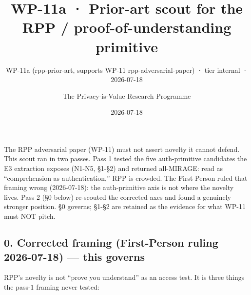 \documentclass[
  11pt,
]{article}
\title{WP-11a · Prior-art scout for the RPP / proof-of-understanding
primitive}
\subtitle{WP-11a (rpp-prior-art, supports WP-11 rpp-adversarial-paper) ·
tier internal · 2026-07-18}
\author{The Privacy-is-Value Research Programme}
\date{2026-07-18}
\begin{document}
\maketitle

The RPP adversarial paper (WP-11) must not assert novelty it cannot
defend. This scout ran in two passes. Pass 1 tested the five
auth-primitive candidates the E3 extraction exposes (N1-N5, §1-§2) and
returned all-MIRAGE: read as ``comprehension-as-authentication,'' RPP is
crowded. The First Person ruled that framing wrong (2026-07-18): the
auth-primitive axis is not where the novelty lives. Pass 2 (§0 below)
re-scouted the corrected axes and found a genuinely stronger position.
§0 governs; §1-§2 are retained as the evidence for what WP-11 must NOT
pitch.

\subsection{0. Corrected framing (First-Person ruling 2026-07-18) ---
this
governs}\label{corrected-framing-first-person-ruling-2026-07-18-this-governs}

RPP's novelty is not ``prove you understand'' as an access test. It is
three things the pass-1 framing never tested:
\end{document}
